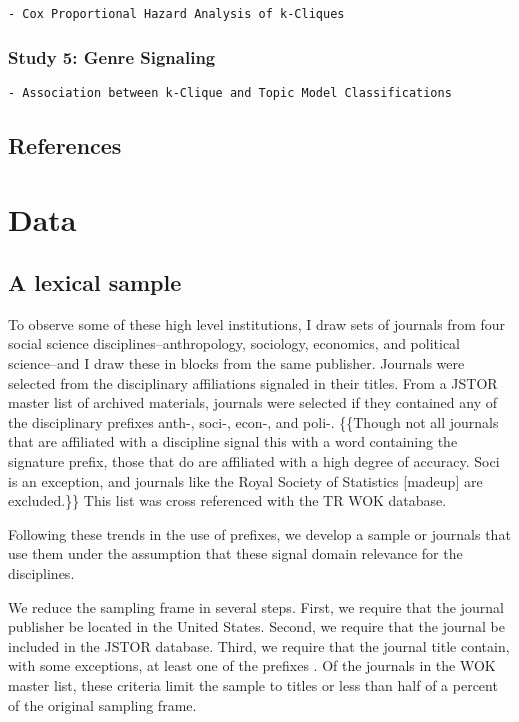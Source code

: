 \documentclass [PhD] {uclathes}
\begin{document}
\begin{verbatim}
- Cox Proportional Hazard Analysis of k-Cliques
\end{verbatim}

\subsection{Study 5: Genre Signaling}\label{study-5-genre-signaling}

\begin{verbatim}
- Association between k-Clique and Topic Model Classifications
\end{verbatim}

\section{References}\label{references}
 \chapter{Data}
\section{A lexical sample}\label{a-lexical-sample}

To observe some of these high level institutions, I draw sets of
journals from four social science disciplines--anthropology, sociology,
economics, and political science--and I draw these in blocks from the
same publisher. Journals were selected from the disciplinary
affiliations signaled in their titles. From a JSTOR master list of
archived materials, journals were selected if they contained any of the
disciplinary prefixes anth-, soci-, econ-, and poli-. \{\{Though not all
journals that are affiliated with a discipline signal this with a word
containing the signature prefix, those that do are affiliated with a
high degree of accuracy. Soci is an exception, and journals like the
Royal Society of Statistics {[}madeup{]} are excluded.\}\} This list was
cross referenced with the TR WOK database.

Following these trends in the use of prefixes, we develop a sample or
journals that use them under the assumption that these signal domain
relevance for the disciplines.

We reduce the sampling frame in several steps. First, we require that
the journal publisher be located in the United States. Second, we
require that the journal be included in the JSTOR database. Third, we
require that the journal title contain, with some exceptions, at least
one of the prefixes . Of the journals in the WOK master list, these
criteria limit the sample to titles or less than half of a percent of
the original sampling frame.
\end{document}
